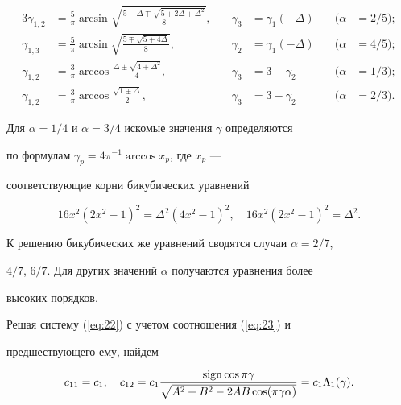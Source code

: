 \begin{alignat*}{3}


\gamma_{1,2}&=\frac{5}{\pi}


\arcsin\sqrt{\frac{5-\Delta\mp\sqrt{5+2\Delta+\Delta^2}}{8}},


&\quad \gamma_3&=\gamma_1(-\Delta) &\quad (\alpha&=2/5);\\


\gamma_{1,3}&=\frac{5}{\pi}


\arcsin\sqrt{\frac{5\mp\sqrt{5+4\Delta}}{8}},


&\quad \gamma_2&=\gamma_1(-\Delta) &\quad (\alpha&=4/5);\\


\gamma_{1,2}&=\frac{3}{\pi}


\arccos\frac{\Delta\pm\sqrt{4+\Delta^2}}{4},


&\quad \gamma_3&=3-\gamma_2 &\quad (\alpha&=1/3);\\


\gamma_{1,2}&=\frac{3}{\pi}\arccos\frac{\sqrt{1\pm\Delta}}{2},


&\quad \gamma_3&=3-\gamma_2 &\quad (\alpha&=2/3).


\end{alignat*}





Для $\alpha=1/4$ и $\alpha=3/4$ искомые значения $\gamma$ определяются


по формулам $\gamma_p=4\pi^{-1}\arccos x_p$, где $x_p$ ---


соответствующие корни бикубических уравнений


$$


16x^2(2x^2-1)^2=\Delta^2(4x^2-1)^2, \quad


16x^2(2x^2-1)^2=\Delta^2.


$$


К решению бикубических же уравнений сводятся случаи $\alpha=2/7$,


$4/7$, $6/7$. Для других значений $\alpha$ получаются уравнения более


высоких порядков.





Решая систему (\ref{eq:22}) с учетом соотношения (\ref{eq:23}) и


предшествующего ему, найдем


\begin{equation} %


c_{11}=c_1,\quad c_{12}=c_1\frac{\sign\cos\pi\gamma}


{\sqrt{A^2+B^2-2AB\cos(\pi\gamma\alpha)}}=c_1\Lambda_1(\gamma).


\label{eq:28}


\end{equation}


